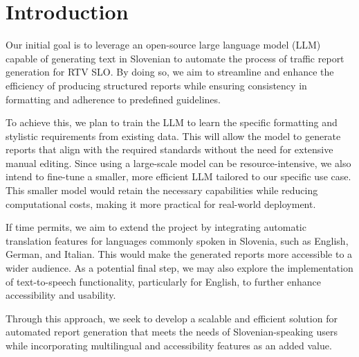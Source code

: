 \documentclass[fleqn,moreauthors,10pt]{ds_report}
\affiliation{\textit{Advisors: Slavko Žitnik}}
\begin{document}
\flushbottom 

\maketitle 

\thispagestyle{empty} 


\section*{Introduction}
	Our initial goal is to leverage an open-source large language model (LLM) capable of generating text in Slovenian to automate the process of traffic report generation for RTV SLO. By doing so, we aim to streamline and enhance the efficiency of producing structured reports while ensuring consistency in formatting and adherence to predefined guidelines.

    To achieve this, we plan to train the LLM to learn the specific formatting and stylistic requirements from existing data. This will allow the model to generate reports that align with the required standards without the need for extensive manual editing. Since using a large-scale model can be resource-intensive, we also intend to fine-tune a smaller, more efficient LLM tailored to our specific use case. This smaller model would retain the necessary capabilities while reducing computational costs, making it more practical for real-world deployment.
    
    If time permits, we aim to extend the project by integrating automatic translation features for languages commonly spoken in Slovenia, such as English, German, and Italian. This would make the generated reports more accessible to a wider audience. As a potential final step, we may also explore the implementation of text-to-speech functionality, particularly for English, to further enhance accessibility and usability.
    
    Through this approach, we seek to develop a scalable and efficient solution for automated report generation that meets the needs of Slovenian-speaking users while incorporating multilingual and accessibility features as an added value.
    
\end{document}
